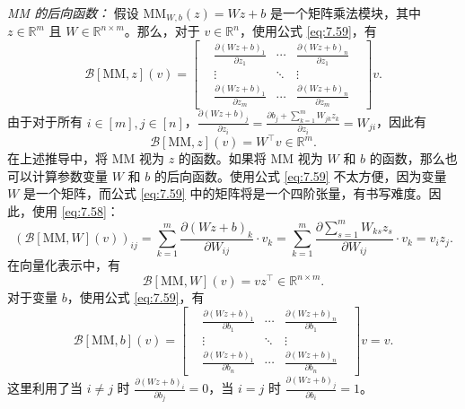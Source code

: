 \vspace{0.5em}
\noindent\textit{MM 的后向函数：} 假设 $\text{MM}_{W,b}(z) = Wz + b$ 是一个矩阵乘法模块，其中 $z \in \mathbb{R}^m$ 且 $W \in \mathbb{R}^{n \times m}$。那么，对于 $v \in \mathbb{R}^n$，使用公式 \eqref{eq:7.59}，有
\begin{equation}
    \mathcal{B}[\text{MM}, z](v) = \begin{bmatrix}
        &\frac{\partial (Wz+b)_1}{\partial z_1}& \cdots& \frac{\partial (Wz+b)_n}{\partial z_1}& \\
        &\vdots& \ddots& \vdots& \\
        &\frac{\partial (Wz+b)_1}{\partial z_m}& \cdots& \frac{\partial (Wz+b)_n}{\partial z_m}&
    \end{bmatrix} v. \label{eq:7.62}
\end{equation}
由于对于所有 $i \in [m], j \in [n]$，$\frac{\partial (Wz+b)_j}{\partial z_i} = \frac{\partial b_j + \sum_{k=1}^m W_{jk} z_k}{\partial z_i} = W_{ji}$，因此有
\begin{equation}
    \mathcal{B}[\text{MM}, z](v) = W^\top v \in \mathbb{R}^m. \label{eq:7.63}
\end{equation}
在上述推导中，将 MM 视为 $z$ 的函数。如果将 MM 视为 $W$ 和 $b$ 的函数，那么也可以计算参数变量 $W$ 和 $b$ 的后向函数。使用公式 \eqref{eq:7.59} 不太方便，因为变量 $W$ 是一个矩阵，而公式 \eqref{eq:7.59} 中的矩阵将是一个四阶张量，有书写难度。因此，使用 \eqref{eq:7.58}：
\begin{equation}
    (\mathcal{B}[\text{MM}, W](v))_{ij} = \sum_{k=1}^m \frac{\partial (Wz+b)_k}{\partial W_{ij}} \cdot v_k = \sum_{k=1}^m \frac{\partial \sum_{s=1}^m W_{ks} z_s}{\partial W_{ij}} \cdot v_k = v_i z_j. \label{eq:7.64}
\end{equation}
在向量化表示中，有
\begin{equation}
    \mathcal{B}[\text{MM}, W](v) = v z^\top \in \mathbb{R}^{n \times m}. \label{eq:7.65}
\end{equation}
对于变量 $b$，使用公式 \eqref{eq:7.59}，有
\begin{equation}
    \mathcal{B}[\text{MM}, b](v) = \begin{bmatrix}
        &\frac{\partial (Wz+b)_1}{\partial b_1}& \cdots& \frac{\partial (Wz+b)_n}{\partial b_1}& \\
        &\vdots& \ddots& \vdots& \\
        &\frac{\partial (Wz+b)_1}{\partial b_n}& \cdots& \frac{\partial (Wz+b)_n}{\partial b_n}&
    \end{bmatrix} v = v. \label{eq:7.66}
\end{equation}
这里利用了当 $i \neq j$ 时 $\frac{\partial (Wz+b)_i}{\partial b_j} = 0$，当 $i = j$ 时 $\frac{\partial (Wz+b)_j}{\partial b_i} = 1$。

